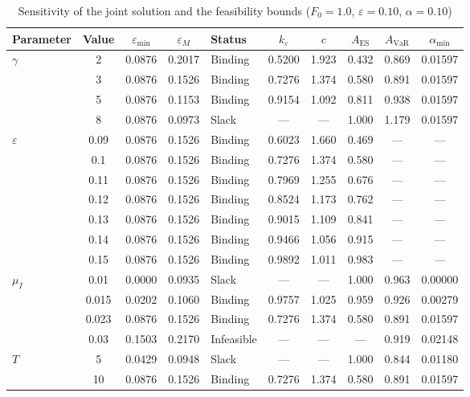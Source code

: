 \begin{table}[htbp]
\centering
\caption{Sensitivity of the joint solution and the feasibility bounds
($F_0 = 1.0$, $\varepsilon = 0.10$, $\alpha = 0.10$)}
\label{tab:sensitivity_v2}
\begin{tabular}{lc cc l cc cc c}
\toprule
Parameter & Value & $\varepsilon_{\min}$ & $\varepsilon_M$ & Status
 & $k_\varepsilon$ & $c$ & $A_{\mathrm{ES}}$ & $A_{\mathrm{VaR}}$
 & $\alpha_{\min}$ \\
\midrule
  \multirow{4}{*}{$\gamma$} & 2 & 0.0876 & 0.2017 & Binding & 0.5200 & 1.923 & 0.432 & 0.869 & 0.01597 \\
   & 3 & 0.0876 & 0.1526 & Binding & 0.7276 & 1.374 & 0.580 & 0.891 & 0.01597 \\
   & 5 & 0.0876 & 0.1153 & Binding & 0.9154 & 1.092 & 0.811 & 0.938 & 0.01597 \\
   & 8 & 0.0876 & 0.0973 & Slack & --- & --- & 1.000 & 1.179 & 0.01597 \\
  \midrule
  \multirow{7}{*}{$\varepsilon$} & 0.09 & 0.0876 & 0.1526 & Binding & 0.6023 & 1.660 & 0.469 & --- & --- \\
   & 0.1 & 0.0876 & 0.1526 & Binding & 0.7276 & 1.374 & 0.580 & --- & --- \\
   & 0.11 & 0.0876 & 0.1526 & Binding & 0.7969 & 1.255 & 0.676 & --- & --- \\
   & 0.12 & 0.0876 & 0.1526 & Binding & 0.8524 & 1.173 & 0.762 & --- & --- \\
   & 0.13 & 0.0876 & 0.1526 & Binding & 0.9015 & 1.109 & 0.841 & --- & --- \\
   & 0.14 & 0.0876 & 0.1526 & Binding & 0.9466 & 1.056 & 0.915 & --- & --- \\
   & 0.15 & 0.0876 & 0.1526 & Binding & 0.9892 & 1.011 & 0.983 & --- & --- \\
  \midrule
  \multirow{4}{*}{$\mu_I$} & 0.01 & 0.0000 & 0.0935 & Slack & --- & --- & 1.000 & 0.963 & 0.00000 \\
   & 0.015 & 0.0202 & 0.1060 & Binding & 0.9757 & 1.025 & 0.959 & 0.926 & 0.00279 \\
   & 0.023 & 0.0876 & 0.1526 & Binding & 0.7276 & 1.374 & 0.580 & 0.891 & 0.01597 \\
   & 0.03 & 0.1503 & 0.2170 & Infeasible & --- & --- & --- & 0.919 & 0.02148 \\
  \midrule
  \multirow{4}{*}{$T$} & 5 & 0.0429 & 0.0948 & Slack & --- & --- & 1.000 & 0.844 & 0.01180 \\
   & 10 & 0.0876 & 0.1526 & Binding & 0.7276 & 1.374 & 0.580 & 0.891 & 0.01597 \\

\end{tabular}
\end{table}

